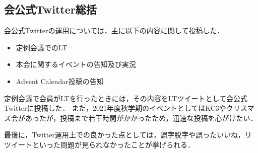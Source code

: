 \subsection*{会公式Twitter総括}


会公式Twitterの運用については，主に以下の内容に関して投稿した．

\begin{itemize}
    \item 定例会議でのLT
    \item 本会に関するイベントの告知及び実況
    \item Advent Calendar投稿の告知
\end{itemize}

定例会議で会員がLTを行ったときには，その内容をLTツイートとして会公式Twitterに投稿した．
また，2021年度秋学期のイベントとしてはKC3やクリスマス会があったが，投稿まで若干時間がかかったため，迅速な投稿を心がけたい．

最後に，Twitter運用上での良かった点としては，誤字脱字や誤ったいいね，リツイートといった問題が見られなかったことが挙げられる．
